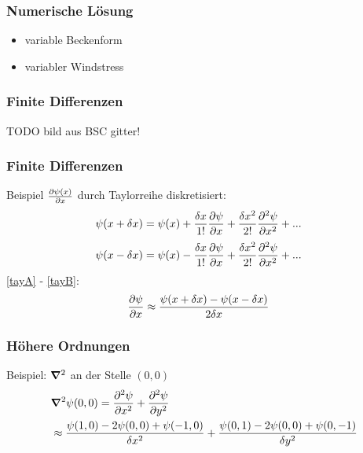 
\begin{frame}
\frametitle{Numerische Lösung}
\begin{itemize}
	\item
	variable Beckenform
	\item
	variabler Windstress
\end{itemize}
\end{frame}


\begin{frame}
\frametitle{Finite Differenzen}
 TODO bild aus BSC gitter!
  \end{frame}

\begin{frame}
\frametitle{Finite Differenzen}
 Beispiel $\frac{\partial\psi(x)}{\partial x}$ durch Taylorreihe diskretisiert:
 \begin{align} \label{tayA}
	\psi(x + \delta x)
	&=
	\psi(x)
	+ \frac{\delta x}{1!} \frac{\partial\psi}{\partial x}
	+ \frac{\delta x^2}{2!} \frac{\partial^2\psi}{\partial x^2}
	+ ...
 \end{align}
 \begin{align} \label{tayB}
	\psi(x - \delta x)
	&=
	\psi(x)
	- \frac{\delta x}{1!} \frac{\partial\psi}{\partial x}
	+ \frac{\delta x^2}{2!} \frac{\partial^2\psi}{\partial x^2}
	+ ...
 \end{align}
 \pause
 \eqref{tayA} - \eqref{tayB}:
 \begin{align}
	\frac{\partial\psi}{\partial x}
	&\approx
	\frac{\psi(x + \delta x) - 	\psi(x - \delta x)}{2 \delta x} \nonumber
 \end{align}
 \end{frame}

\begin{frame}
	\frametitle{Höhere Ordnungen}
	Beispiel: $\mathbf{\bm{\nabla}}^2$ an der Stelle $(0,0)$
	\begin{align}
		&\mathbf{\bm{\nabla}}^2 \psi(0,0)
		=
		 \frac{\partial^2 \psi}{\partial x^2} + \frac{\partial^2 \psi}{\partial y^2} \nonumber\\
		&\approx
		\frac{\psi(1,0) - 2 \psi(0,0) + \psi(-1,0)}{\delta x^2}
		+
		\frac{\psi(0,1) - 2 \psi(0,0) + \psi(0,-1)}{\delta y^2}\nonumber
	\end{align}
\end{frame}

